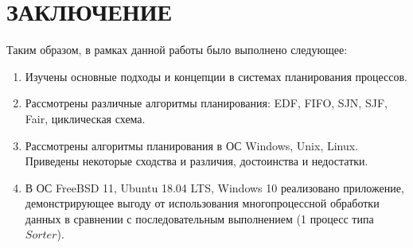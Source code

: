 \newpage
\section*{ЗАКЛЮЧЕНИЕ}

Таким образом, в рамках данной работы было выполнено следующее:
\begin{enumerate}
    \item Изучены основные подходы и концепции в системах планирования процессов.
    \item Рассмотрены различные алгоритмы планирования: EDF, FIFO, SJN, SJF, Fair, циклическая схема.
    \item Рассмотрены алгоритмы планирования в ОС Windows, Unix, Linux. Приведены некоторые сходства и различия, достоинства и недостатки.
    \item В ОС FreeBSD 11, Ubuntu 18.04 LTS, Windows 10 реализовано приложение, демонстрирующее выгоду от использования многопроцессной обработки данных в сравнении с последовательным выполнением (1 процесс типа $Sorter$). 
\end{enumerate}
